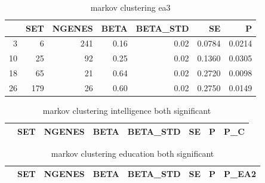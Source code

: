 \begin{table}[ht]
\centering
\begin{tabular}{rrrrrrr}
  \hline
 & SET & NGENES & BETA & BETA\_STD & SE & P \\ 
  \hline
3 &  6 & 241 & 0.16 & 0.02 & 0.0784 & 0.0214 \\ 
  10 & 25 & 92 & 0.25 & 0.02 & 0.1360 & 0.0305 \\ 
  18 & 65 & 21 & 0.64 & 0.02 & 0.2720 & 0.0098 \\ 
  26 & 179 & 26 & 0.60 & 0.02 & 0.2750 & 0.0149 \\ 
   \hline
\end{tabular}
\caption{markov clustering ea3} 
\label{lab:markov clustering ea3}
\end{table}
\begin{table}[ht]
\centering
\begin{tabular}{rrrrrrrr}
  \hline
 & SET & NGENES & BETA & BETA\_STD & SE & P & P\_C \\ 
  \hline
\hline
\end{tabular}
\caption{markov clustering intelligence both significant} 
\label{lab:markov clustering intelligence both significant}
\end{table}
\begin{table}[ht]
\centering
\begin{tabular}{rrrrrrrr}
  \hline
 & SET & NGENES & BETA & BETA\_STD & SE & P & P\_EA2 \\ 
  \hline
\hline
\end{tabular}
\caption{markov clustering education both significant} 
\label{lab:markov clustering education both significant}
\end{table}


